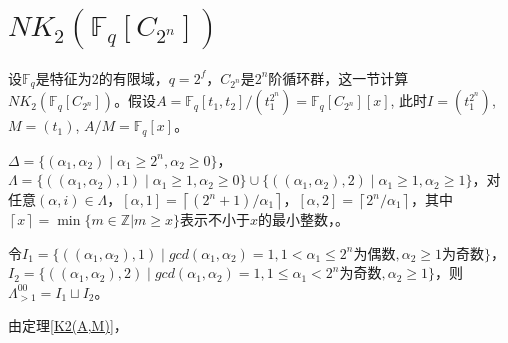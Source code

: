 \section{$NK_2(\mathbb{F}_q[C_{2^n}])$} %
\label{sec:NK_2(F_q[C_{2^n}])}

设$\mathbb{F}_q$是特征为$2$的有限域，$q=2^f$，$C_{2^n}$是$2^n$阶循环群，这一节计算$NK_2(\mathbb{F}_q[C_{2^n}])$。假设$A=\mathbb{F}_q[t_1,t_2]/(t_1^{2^n})=\mathbb{F}_q[C_{2^n}][x]$, 此时$I=(t_1^{2^n})$, $M=(t_1)$, $A/M=\mathbb{F}_q[x]$。

\begin{lemma}
	$\Delta =\{(\alpha_1,\alpha_2)\mid \alpha_1\geq 2^n, \alpha_2 \geq 0\}$，$\Lambda = \{((\alpha_1,\alpha_2),1) \mid \alpha_1\geq 1, \alpha_2\geq 0\}\cup \{((\alpha_1,\alpha_2),2) \mid \alpha_1\geq 1, \alpha_2\geq 1\}$，对任意$(\alpha,i)\in \Lambda$，$[\alpha,1]=\left \lceil (2^n+1)/\alpha_1 \right \rceil$，$[\alpha,2]=\left \lceil 2^n/\alpha_1 \right \rceil$，其中$\left \lceil x \right \rceil=\min \{m\in \mathbb{Z}|m\geq x\}$表示不小于$x$的最小整数，。
\end{lemma}

\begin{lemma}
令$I_1 =\{((\alpha_1,\alpha_2),1)\mid gcd(\alpha_1,\alpha_2)=1, 1< \alpha_1\leq 2^n\text{为偶数}, \alpha_2\geq 1\text{为奇数}\}$，$I_2=\{((\alpha_1,\alpha_2),2)\mid gcd(\alpha_1,\alpha_2)=1, 1\leq \alpha_1<2^n\text{为奇数}, \alpha_2\geq 1\}$，则$\Lambda^{00}_{>1}=I_1\sqcup I_2$。
\end{lemma}
由定理\ref{K2(A,M)}，

